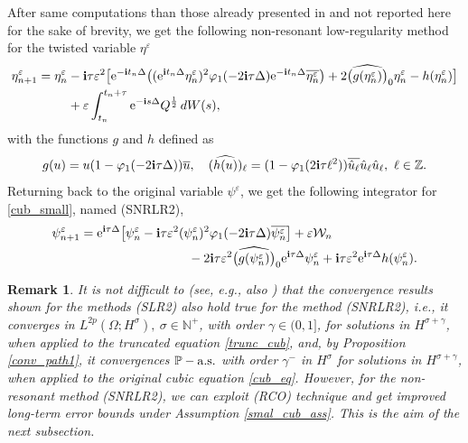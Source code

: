 \documentclass[a4paper]{amsart}
\newtheorem{remark}{Remark}[section]
\begin{document}
After same computations than those already presented in \cite{fe_ka} and not reported here for the sake of brevity, we get the following non-resonant low-regularity method for the twisted variable $\eta^\varepsilon$
\begin{align*}
\eta^\varepsilon_{n+1}=\eta^\varepsilon_n&-{\bf i} \tau\varepsilon^2\big[{\rm e}^{-{\bf i}t_n\Delta}\big(({\rm e}^{{\bf i}t_n\Delta} \eta^\varepsilon_n)^2 \varphi_1(-2{\bf i}\tau\Delta){\rm e}^{-{\bf i}t_n\Delta} \overline{\eta^\varepsilon_n}\big)
  +2\widehat{\big(g(\eta^\varepsilon_n)\big)}_0 \eta^\varepsilon_n-h(\eta^\varepsilon_n)\big]\\
   &+\varepsilon\int_{t_n}^{t_n+\tau} {\rm e}^{-{\bf i}s\Delta}Q^{\frac{1}{2}}\,dW(s),
   \end{align*}
   with the functions $g$ and $h$ defined as 
   $$g(u)=u(1-\varphi_1(-2{\bf i}\tau\Delta))\overline{u}, \quad (\widehat{h(u)})_{\ell}=(1-\varphi_1(2{\bf i}\tau \ell^2))\overline{\hat{u}_{\ell}}\hat{u}_{\ell}\hat{u}_{\ell}, \ \ell\in\mathbb{Z}.
   $$ 
Returning back to the original variable $\psi^\varepsilon$, we get the following integrator for \eqref{cub_small}, named (SNRLR2),
    \begin{align}
    \psi^\varepsilon_{n+1}&={\rm e}^{{\bf i}\tau\Delta}\big[\psi^\varepsilon_n-{\bf i}\tau\varepsilon^2 (\psi^\varepsilon_n)^2\varphi_1(-2{\bf i}\tau\Delta)\overline{\psi^\varepsilon_n}\big]+\varepsilon\mathcal{W}_n\notag\\
    &\hspace{3cm}-2{\bf i}\tau\varepsilon^2 \widehat{\big(g(\psi^\varepsilon_n)\big)}_0 {\rm e}^{{\bf i}\tau\Delta} \psi^\varepsilon_n+{\bf i}\tau\varepsilon^2 {\rm e}^{{\bf i}\tau\Delta} h(\psi^\varepsilon_n)    \label{SLNR2} .
        \end{align}
    \begin{remark}
        It is not difficult to (see, e.g., also \cite{fe_ka}) that the convergence results shown for the methods (SLR2) also hold true for the method (SNRLR2), i.e., it converges in $L^{2p}(\Omega; H^\sigma), \ \sigma\in\mathbb{N}^+$, with order $\gamma\in(0,1]$, for solutions in $H^{\sigma+\gamma}$, when applied to the truncated equation \eqref{trunc_cub}, and,
        by Proposition \ref{conv_path1}, it convergences $\mathbb{P}-{\rm a.s.}$ with order $\gamma^-$ in $H^\sigma$ for solutions in $H^{\sigma+\gamma}$, when applied to the original cubic equation \eqref{cub_eq}. However, for the non-resonant method (SNRLR2), we can exploit (RCO) technique \cite{bao,fe_ka} and get improved long-term error bounds under Assumption \ref{smal_cub_ass}. This is the aim of the next subsection.
        \end{remark}
\end{document}
